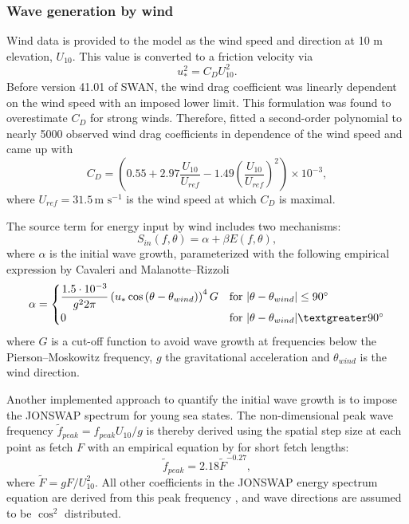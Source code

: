 \subsubsection{Wave generation by wind}

Wind data is provided to the model as the wind speed and direction at 10 m elevation, $U_{10}$. This value is converted to a friction velocity via
\begin{equation}
 u_\ast^2 = C_D U_{10}^2.
\end{equation}
Before version 41.01 of SWAN, the wind drag coefficient was linearly dependent on the wind speed with an imposed lower limit. This formulation was found to overestimate $C_D$ for strong winds. Therefore, \cite{zijlema2012} fitted a second-order polynomial to nearly 5000 observed wind drag coefficients in dependence of the wind speed and came up with 
\begin{equation}
 C_D = \left( 0.55 + 2.97 \dfrac{U_{10}}{U_{ref}} - 1.49 \left( \dfrac{U_{10}}{U_{ref}} \right)^2 \right) \times 10^{-3} ,
\end{equation}
where $U_{ref} = 31.5 \, \text{m s}^{-1}$ is the wind speed at which $C_D$ is maximal.

The source term for energy input by wind includes two mechanisms:
\begin{equation}\label{gen}
 S_{in} (f, \theta) = \alpha + \beta E(f,\theta),
\end{equation}
where $\alpha$ is the initial wave growth, parameterized with the following empirical expression by Cavaleri and Malanotte--Rizzoli
\begin{equation}
 \alpha = 
 \begin{cases}
  \dfrac{1.5 \cdot 10^{-3}}{g^2 2 \pi} \left(u_\ast \cos{(\theta - \theta_{wind})}\right)^4 G & \text{for } |\theta - \theta_{wind}| \le 90^\circ  \\
  0 & \text{for } |\theta - \theta_{wind}| \textgreater 90^\circ  \\
 \end{cases}
\end{equation}
where $G$ is a cut-off function to avoid wave growth at frequencies below the Pierson--Moskowitz frequency, $g$ the gravitational acceleration and $\theta_{wind}$ is the wind direction. 

Another implemented approach to quantify the initial wave growth is to impose the JONSWAP spectrum for young sea states. The non-dimensional peak wave frequency $\tilde{f}_{peak} = f_{peak} U_{10} / g$ is thereby derived using the spatial step size at each point as fetch $F$ with an empirical equation by \cite{kahma1992} for short fetch lengths:
\begin{equation}
 \tilde{f}_{peak} = 2.18 \tilde{F}^{-0.27},
\end{equation}
where $\tilde{F} = g F / U_{10}^2$. All other coefficients in the JONSWAP energy spectrum equation are derived from this peak frequency \citep[][]{holthuijsen2007}, and  wave directions are assumed to be $\cos^2$ distributed.

